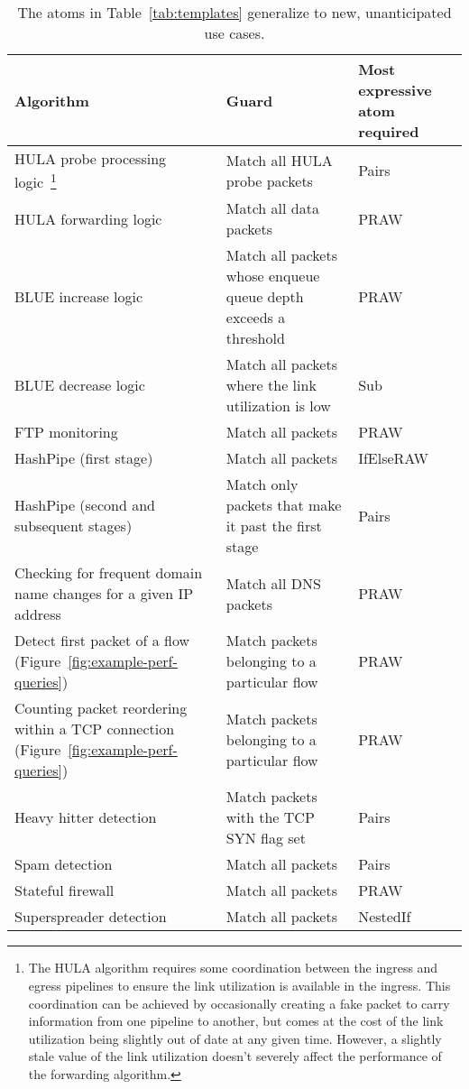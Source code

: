 \begin{table}[!t]
\centering
\begin{small}
  \begin{tabular}{|p{}|p{} | p{}|}
\hline
Algorithm & Guard & Most expressive atom required\\
\hline
HULA probe processing logic~\cite{hula}\footnote{The HULA algorithm requires
some coordination between the ingress and egress pipelines to ensure the link
utilization is available in the ingress. This coordination can be achieved by
occasionally creating a fake packet to carry information from one pipeline to
another, but comes at the cost of the link utilization being slightly out of
date at any given time. However, a slightly stale value of the link utilization
doesn't severely affect the performance of the forwarding algorithm.} & Match
all HULA probe packets & Pairs \\
\hline
HULA forwarding logic~\cite{hula} & Match all data packets & PRAW \\
\hline
BLUE increase logic~\cite{blue} & Match all packets whose enqueue queue depth exceeds a threshold & PRAW \\
\hline
BLUE decrease logic~\cite{blue} & Match all packets where the link utilization is low & Sub \\
\hline
FTP monitoring~\cite{snap} & Match all packets & PRAW \\
\hline
HashPipe (first stage)~\cite{hashpipe} & Match all packets & IfElseRAW \\
\hline
HashPipe (second and subsequent stages)~\cite{hashpipe} & Match only packets that make it past the first stage & Pairs\\
\hline
Checking for frequent domain name changes for a given IP address~\cite{snap} & Match all DNS packets & PRAW \\
\hline
Detect first packet of a flow (Figure~\ref{fig:example-perf-queries}) & Match packets belonging to a particular flow & PRAW \\
\hline
Counting packet reordering within a TCP connection (Figure~\ref{fig:example-perf-queries}) & Match packets belonging to a particular flow & PRAW \\
\hline
Heavy hitter detection~\cite{snap} & Match packets with the TCP SYN flag set & Pairs \\
\hline
Spam detection~\cite{snap} & Match all packets & Pairs \\
\hline
Stateful firewall~\cite{snap} & Match all packets & PRAW \\
\hline
Superspreader detection~\cite{snap} & Match all packets & NestedIf \\
\hline
\end{tabular}
\caption{The atoms in Table~\ref{tab:templates} generalize to new, unanticipated use cases.}
\label{tab:atoms_generalize}
\end{small}
\end{table}

